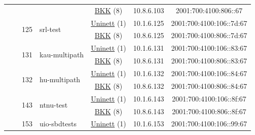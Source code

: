 \begin{small}
\begin{center}
\begin{longtable}{|c|c|c|c|c|c|c|c|}
  &  & \multicolumn{2}{|c|}{} & \multicolumn{2}{|c|}{\tiny{\href{http://bkk.no}{BKK} (8)}} & \tiny{10.8.6.103} & \tiny{2001:700:4100:806::67} \\* \cline{3-3}\cline{4-4}\cline{5-5}\cline{6-6}\cline{7-7}\cline{8-8}
  &  & \multirow{2}{*}{\tiny{125}} & \multicolumn{1}{|l|}{\multirow{2}{*}{\tiny{srl-test}}} & \multicolumn{2}{|c|}{\tiny{\href{https://www.uninett.no}{Uninett} (1)}} & \tiny{10.1.6.125} & \tiny{2001:700:4100:106::7d:67} \\* \cline{5-5}\cline{6-6}\cline{7-7}\cline{8-8}
  &  &  &  & \multicolumn{2}{|c|}{\tiny{\href{http://bkk.no}{BKK} (8)}} & \tiny{10.8.6.125} & \tiny{2001:700:4100:806::7d:67} \\* \cline{3-3}\cline{4-4}\cline{5-5}\cline{6-6}\cline{7-7}\cline{8-8}
  &  & \multirow{2}{*}{\tiny{131}} & \multicolumn{1}{|l|}{\multirow{2}{*}{\tiny{kau-multipath}}} & \multicolumn{2}{|c|}{\tiny{\href{https://www.uninett.no}{Uninett} (1)}} & \tiny{10.1.6.131} & \tiny{2001:700:4100:106::83:67} \\* \cline{5-5}\cline{6-6}\cline{7-7}\cline{8-8}
  &  &  &  & \multicolumn{2}{|c|}{\tiny{\href{http://bkk.no}{BKK} (8)}} & \tiny{10.8.6.131} & \tiny{2001:700:4100:806::83:67} \\* \cline{3-3}\cline{4-4}\cline{5-5}\cline{6-6}\cline{7-7}\cline{8-8}
  &  & \multirow{2}{*}{\tiny{132}} & \multicolumn{1}{|l|}{\multirow{2}{*}{\tiny{hu-multipath}}} & \multicolumn{2}{|c|}{\tiny{\href{https://www.uninett.no}{Uninett} (1)}} & \tiny{10.1.6.132} & \tiny{2001:700:4100:106::84:67} \\* \cline{5-5}\cline{6-6}\cline{7-7}\cline{8-8}
  &  &  &  & \multicolumn{2}{|c|}{\tiny{\href{http://bkk.no}{BKK} (8)}} & \tiny{10.8.6.132} & \tiny{2001:700:4100:806::84:67} \\* \cline{3-3}\cline{4-4}\cline{5-5}\cline{6-6}\cline{7-7}\cline{8-8}
  &  & \multirow{2}{*}{\tiny{143}} & \multicolumn{1}{|l|}{\multirow{2}{*}{\tiny{ntnu-test}}} & \multicolumn{2}{|c|}{\tiny{\href{https://www.uninett.no}{Uninett} (1)}} & \tiny{10.1.6.143} & \tiny{2001:700:4100:106::8f:67} \\* \cline{5-5}\cline{6-6}\cline{7-7}\cline{8-8}
  &  &  &  & \multicolumn{2}{|c|}{\tiny{\href{http://bkk.no}{BKK} (8)}} & \tiny{10.8.6.143} & \tiny{2001:700:4100:806::8f:67} \\* \cline{3-3}\cline{4-4}\cline{5-5}\cline{6-6}\cline{7-7}\cline{8-8}
  &  & \multirow{2}{*}{\tiny{153}} & \multicolumn{1}{|l|}{\multirow{2}{*}{\tiny{uio-sbdtests}}} & \multicolumn{2}{|c|}{\tiny{\href{https://www.uninett.no}{Uninett} (1)}} & \tiny{10.1.6.153} & \tiny{2001:700:4100:106::99:67} \\* \cline{5-5}\cline{6-6}\cline{7-7}\cline{8-8}

\end{longtable}
\end{center}
\end{small}
